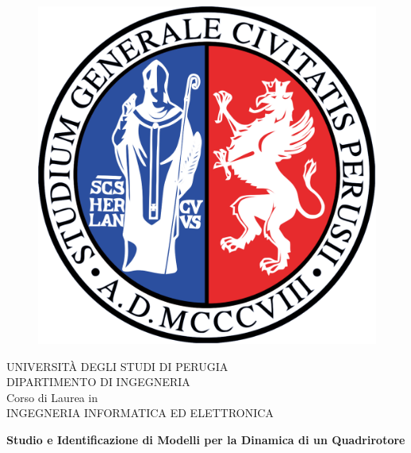 
\begin{titlepage}
   
   \begin{figure}[!htb]
    	\centering
    	\includegraphics[keepaspectratio=true,scale=0.13]{gfx/logo_unipg}
	\end{figure}

	\begin{center}
    	\normalsize{UNIVERSITÀ DEGLI STUDI DI PERUGIA}
    	\vspace{5mm}
    	\\ \normalsize{DIPARTIMENTO DI INGEGNERIA}
    	\vspace{5mm}
    	\\ \small{Corso di Laurea in}
    	\vspace{5mm}
    	\\ \normalsize{INGEGNERIA INFORMATICA ED ELETTRONICA}
	\end{center}

	\vspace{10mm}
	
	\begin{center}
    	{\Large{\bf Studio e Identificazione di Modelli per la Dinamica di un Quadrirotore}}
	\end{center}
	
	\vspace{15mm}


\end{titlepage}
